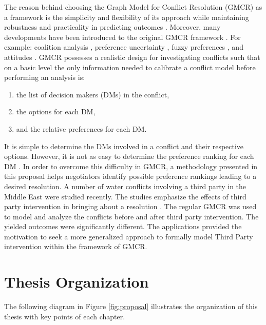 \documentclass[letterpaper,12pt,titlepage,oneside,final]{book}
\begin{document}
The reason behind choosing the Graph Model for Conflict Resolution (GMCR) as a framework is the simplicity and flexibility of its approach while maintaining robustness and practicality in predicting outcomes \citep{Kilgour1987,Fang1989,fang1993,Inohara2011}. Moreover, many developments have been introduced to the original GMCR framework \citep{kilgour2005}. For example: coalition analysis \citep{inohara2008a,inohara2008b}, preference uncertainty \citep{li2004} , fuzzy preferences \citep{bashar2012fuzzy,hipel2011fuzzy} , and attitudes \citep{walker2008}. GMCR  possesses a realistic design for investigating conflicts such that on a basic level the only information needed to calibrate a conflict model before performing an analysis is:
\begin{enumerate}
\item the list of decision makers (DMs) in the conflict,
\item the options for each DM,
\item and the relative preferences for each DM.
\end{enumerate}
It is simple to determine the DMs involved in a conflict and their respective options. However, it is not as easy to determine the preference ranking for each DM \citep{kilgour1996negotiation}. In order to overcome this difficulty in GMCR, a methodology presented in this proposal helps negotiators identify possible preference rankings leading to a desired resolution. A number of water conflicts involving a third party in the Middle East were studied recently. The studies emphasize the effects of third party intervention in bringing about a resolution \citep{HipelRami}. The regular GMCR was used to model and analyze the conflicts before and after third party intervention. The yielded outcomes were significantly different. The applications provided the motivation to seek a more generalized approach to formally model Third Party intervention within the framework of GMCR.


\section{Thesis Organization}

The following diagram in Figure \ref{fig:proposal} illustrates the organization of this thesis with key points of each chapter.
\end{document}
